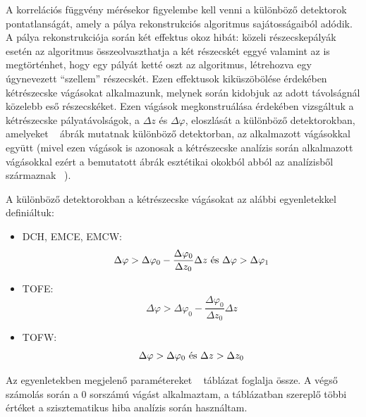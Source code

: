 \documentclass[11pt,a4paper]{article}
\numberwithin{equation}{subsection}
\numberwithin{figure}{section}
\begin{document}
A korrelációs függvény mérésekor figyelembe kell venni a különböző detektorok pontatlanságát, amely a pálya rekonstrukciós algoritmus sajátosságaiból adódik. A pálya rekonstrukciója során két effektus okoz hibát: közeli részecskepályák esetén az algoritmus összeolvaszthatja a két részecskét eggyé valamint az is megtörténhet, hogy egy pályát ketté oszt az algoritmus, létrehozva egy úgynevezett ``szellem'' részecskét. Ezen effektusok kiküszöbölése érdekében kétrészecske vágásokat alkalmazunk, melynek során kidobjuk az adott távolságnál közelebb eső részecskéket. Ezen vágások megkonstruálása érdekében vizsgáltuk a kétrészecske pályatávolságok, a $\Delta z$ és $\Delta\varphi$, eloszlását a különböző detektorokban, amelyeket ~ ábrák mutatnak különböző detektorban, az alkalmazott vágásokkal együtt (mivel ezen vágások is azonosak a kétrészecske analízis során alkalmazott vágásokkal ezért a bemutatott ábrák esztétikai okokból abból az analízisből származnak ~\cite{AN1244}).

A különböző detektorokban a kétrészecske vágásokat az alábbi egyenletekkel definiáltuk:

\begin{itemize}
\item DCH, EMCE, EMCW:
\begin{equation}
\Delta\varphi > \Delta\varphi_0-\frac{\Delta\varphi_0}{\Delta z_0}\Delta z \textnormal{ és } \Delta\varphi > \Delta\varphi_1 \label{e:newdchpaircut}
\end{equation}
\item TOFE:
\begin{equation}
\Delta\varphi > \Delta\varphi_0-\frac{\Delta\varphi_0}{\Delta z_0}\Delta z \label{e:newtofepaircut}
\end{equation}
\item TOFW:
\begin{equation}
\Delta\varphi > \Delta\varphi_0 \textnormal{ és } \Delta z > \Delta z_0 \label{e:newtofwpaircut}
\end{equation}
\end{itemize}

Az egyenletekben megjelenő paramétereket ~ táblázat foglalja össze. A végső számolás során a $0$ sorszámú vágást alkalmaztam, a táblázatban szereplő többi értéket a szisztematikus hiba analízis során használtam.
\end{document}
